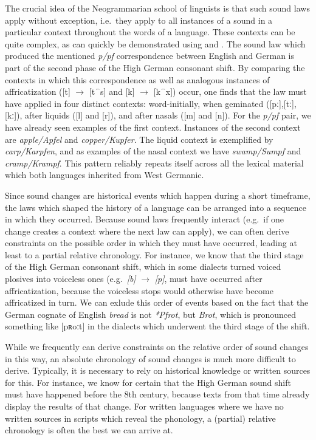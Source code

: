 The crucial idea of the Neogrammarian school of linguists is that such sound laws apply without exception, i.e.\ they apply to all instances of a sound in a particular context throughout the words of a language. These contexts can be quite complex, as can quickly be demonstrated using  and . The sound law which produced the mentioned \textit{p/pf} correspondence between English and German is part of the second phase of the High German consonant shift. By comparing the contexts in which this correspondence as well as analogous instances of affricatization ([t] $\rightarrow$ [t⁀s] and [k] $\rightarrow$ [k⁀x]) occur, one finds that the law must have applied in four distinct contexts: word-initially, when geminated ([pː],[tː],[kː]), after liquids ([l] and [r]), and after nasals ([m] and [n]). For the \textit{p/pf} pair, we have already seen examples of the first context. Instances of the second context are \textit{apple/Apfel} and \textit{copper/Kupfer}. The liquid context is exemplified by \textit{carp/Karpfen}, and as examples of the nasal context we have \textit{swamp/Sumpf} and \textit{cramp/Krampf}. This pattern reliably repeats itself across all the lexical material which both languages inherited from West Germanic.

Since sound changes are historical events which happen during a short timeframe, the laws which shaped the history of a language can be arranged into a sequence in which they occurred. Because sound laws frequently interact (e.g.\ if one change creates a context where the next law can apply), we can often derive constraints on the possible order in which they must have occurred, leading at least to a partial relative chronology. For instance, we know that the third stage of the High German consonant shift, which in some  dialects turned voiced plosives into voiceless ones (e.g.\ \textit{[b]} $\rightarrow$ \textit{[p]}, must have occurred after affricatization, because the voiceless stops would otherwise have become affricatized in turn. We can exlude this order of events based on the fact that the German cognate of English \textit{bread} is not \textit{*Pfrot}, but \textit{Brot}, which is pronounced something like [pʀoːt] in the dialects which underwent the third stage of the shift.

While we frequently can derive constraints on the relative order of sound changes in this way, an absolute chronology of sound changes is much more difficult to derive. Typically, it is necessary to rely on historical knowledge or written sources for this. For instance, we know for certain that the High German sound shift must have happened before the 8th century, because  texts from that time already display the results of that change. For written languages where we have no written sources in scripts which reveal the phonology, a (partial) relative chronology is often the best we can arrive at.

